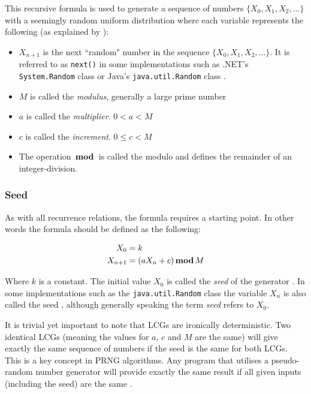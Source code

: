 This recursive formula is used to generate a sequence of numbers $\{X_0, X_1, X_2,...\}$ with a seemingly random uniform distribution \citep{Knuth_art2} where each variable represents the following (as explained by \citep{hamid_lcgSecurity}):
\begin{itemize}
\item $X_{n+1}$ is the next ``random" number in the sequence $\{X_0, X_1, X_2,...\}$. It is referred to as \texttt{next()} in some implementations such as .NET's \texttt{System.Random} class \citep{System.Random} or Java's \texttt{java.util.Random} class \citep{java.util.Random}.
\item $M$ is called the {\em modulus}, generally a large prime number \citep{park_miller}
\item $a$ is called the {\em multiplier}. $0<a<M$
\item $c$ is called the {\em increment}. $0 \leq c<M$
\item The operation $ \, \textbf{mod} \, $ is called the modulo and defines the remainder of an integer-division.
\end{itemize}

\subsubsection{Seed}
As with all recurrence relations, the formula requires a starting point. In other words the formula should be defined as the following:

\begin{align}
 X_{0} &= k \nonumber \\
 X_{n+1} &= (a X_{n} + c) \, \textbf{mod} \, M \nonumber
\end{align} 

Where $k$ is a constant. The initial value $X_0$ is called the {\em seed} of the generator \citep{hamid_lcgSecurity}. In some implementations such as the  \texttt{java.util.Random} class the variable $X_n$ is also called the seed \citep{java.util.Random}, although generally speaking the term {\em seed} refers to $X_0$. 

It is trivial yet important to note that LCGs are ironically deterministic. Two identical LCGs (meaning the values for $a$, $c$ and $M$ are the same) will give exactly the same sequence of numbers if the seed is the same for both LCGs. This is a key concept in PRNG algorithms. Any program that utilises a pseudo-random number generator will provide exactly the same result if all given inputs (including the seed) are the same \citep{Knuth_art2}.

